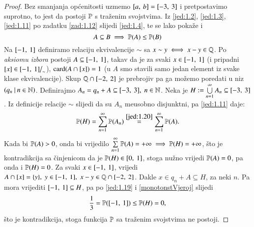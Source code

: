 
\begin{proof}
    Bez smanjanja op\' cenitosti uzmemo $[{a}, \:{b}] = [{-3}, \:{3}]$ i pretpostavimo suprotno, to jest da postoji $\mathbb{P}$ s tra\v zenim svojstvima.
    Iz \eqref{jed:1.2}, \eqref{jed:1.3}, \eqref{jed:1.11} po zadatku \ref{zad:1.12} slijedi \eqref{jed:1.4}, te se lako poka\v ze i
    \begin{equation} \label{monotonstVjeroj}
        A \subseteq B \implies \mathbb{P}({A}) \leq \mathbb{P}({B})
    \end{equation}
    Na $[{-1}, \:{1}]$ definiramo relaciju ekvivalencije $\sim$ sa $x \sim y \iff x - y \in \mathbb{Q}$.
    Po \emph{aksiomu izbora} postoji $A \subseteq [{-1}, \:{1}]$, takav da je za svaki $x \in [{-1}, \:{1}]$ (i pripadni $[x] \in [{-1}, \:{1}] \big/_{\sim}$), $\textnormal{card}({A \cap [x]}) = 1$ (u $A$ smo stavili samo jedan element iz svake klase ekvivalencije).
    Skup $\mathbb{Q} \cap [{-2}, \:{2}]$ je prebrojiv pa ga mo\v zemo poredati u niz $({q_n} \: | \: {n \in \mathbb{N}})$. 
    Definirajmo $A_n = q_n + A \subseteq [{-3}, \:{3}], \; n \in
    \mathbb{N}$.
    Neka je $H := \bigcup\limits_{n=1}^{\infty} A_n \subseteq [{-3}, \:{3}]$. 
    Iz definicije relacije $\sim$ slijedi da su $A_n$ me\dj usobno disjunktni, pa \eqref{jed:1.11} daje:
    \begin{equation*}
        \mathbb{P}({H}) = \sum\limits_{n=1}^{\infty} \mathbb{P}({A_n})
            \overset{\eqref{jed:1.20}}{=} \sum\limits_{n=1}^{\infty}
            \mathbb{P}({A}).
    \end{equation*}
    Kada bi $\mathbb{P}({A}) > 0$, onda bi vrijedilo $\sum\limits_{n=1}^{\infty} \mathbb{P}({A}) = + \infty \implies \mathbb{P}({H}) = +\infty$, \v sto je kontradikcija sa \v cinjenicom da je $\mathbb{P}({H}) \in [{0}, \:{1}]$, stoga nu\v zno vrijedi $\mathbb{P}({A}) = 0$, pa onda i $\mathbb{P}({H}) = 0$.
    Za svaki $x \in [{-1}, \:{1}]$, vrijedi $A \cap [x] = \{y\}, \; y \in [{-1}, \:{1}], \; x - y \in \mathbb{Q} \cap [{-2}, \:{2}]$.
    Dakle $x \in q_n + A \subseteq H$, za neki $n$.
    Pa mora vrijediti $[{-1}, \:{1}] \subseteq H$, pa po \eqref{jed:1.19} i \eqref{monotonstVjeroj} slijedi
    \begin{equation*}
        \frac{1}{3} = \mathbb{P}({[{-1}, \:{1}]}) \leq \mathbb{P}({H}) = 0,
    \end{equation*}
    \v sto je kontradikcija, stoga funkcija $\mathbb{P}$ sa tra\v zenim svojstvima ne postoji.
\end{proof}

